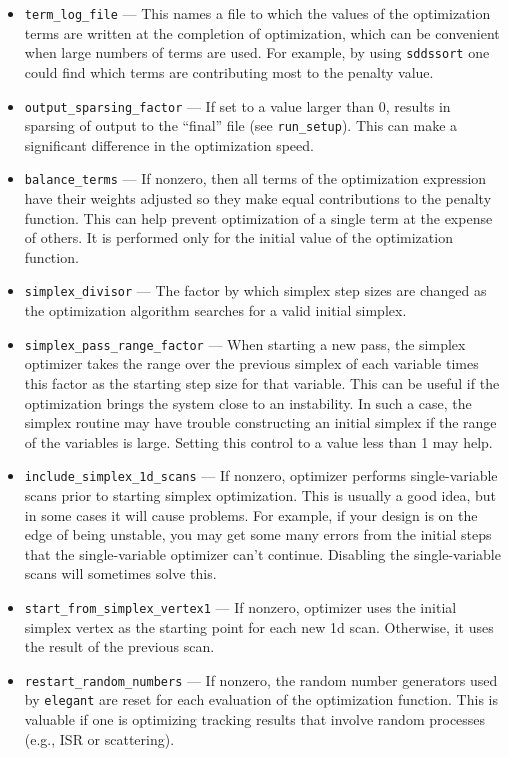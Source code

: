 \documentclass[11pt]{article}
\begin{document}
\begin{itemize}
\item \verb|term_log_file| --- This names a file to which the
  values of the optimization terms are written at the completion of optimization, which can be convenient when large numbers
  of terms are used.  For example, by using \verb|sddssort| one could find which terms are contributing most to the
  penalty value.

\item \verb|output_sparsing_factor| --- If set to a value larger than 0, results in
sparsing of output to the ``final'' file (see \verb|run_setup|). This can make
a significant difference in the optimization speed.

\item \verb|balance_terms| --- If nonzero, then all terms of the optimization expression have
 their weights adjusted so they make equal contributions to the penalty function.  This can
 help prevent optimization of a single term at the expense of others.  It is performed only 
 for the initial value of the optimization function.

\item \verb|simplex_divisor| --- The factor by which simplex step sizes are changed as the 
 optimization algorithm searches for a valid initial simplex.

\item \verb|simplex_pass_range_factor| --- When starting a new pass, the simplex optimizer takes
 the range over the previous simplex of each variable times this factor
 as the starting step size for that variable.  This can be useful if the optimization brings
 the system close to an instability.  In such a case, the simplex routine may have trouble
 constructing an initial simplex if the range of the variables is large. Setting this control
 to a value less than 1 may help.
 
\item \verb|include_simplex_1d_scans| --- If nonzero, optimizer performs single-variable scans prior to 
 starting simplex optimization.  This is usually a good idea, but in some cases it will cause problems.
 For example, if your design is on the edge of being unstable, you may get some many errors from the
 initial steps that the single-variable optimizer can't continue.  Disabling the
 single-variable scans will sometimes solve this.

\item \verb|start_from_simplex_vertex1| --- If nonzero, optimizer uses the initial simplex vertex as the
 starting point for each new 1d scan.  Otherwise, it uses the result of the previous scan.

\item \verb|restart_random_numbers| --- If nonzero, the random number generators used by {\tt elegant} are
 reset for each evaluation of the optimization function.  This is valuable if one is optimizing tracking
 results that involve random processes (e.g., ISR or scattering).

\end{itemize}
\end{document}
